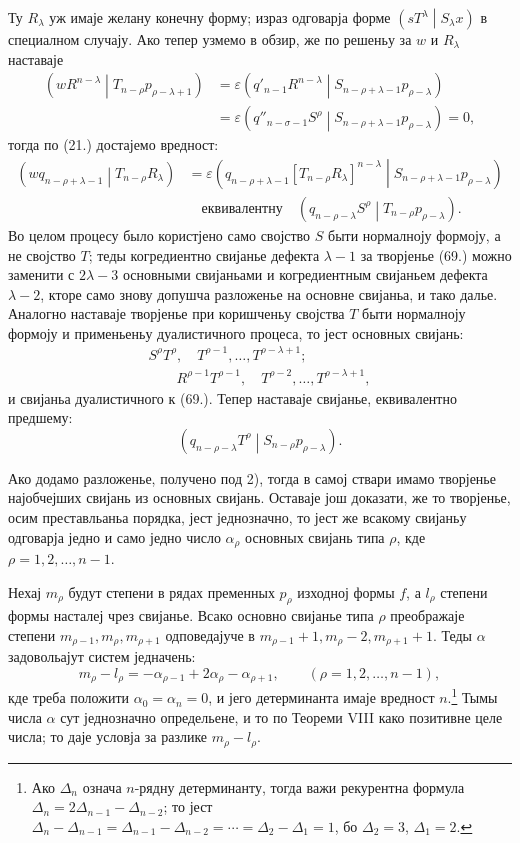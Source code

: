 ﻿\documentclass[11pt]{article}
\newcommand{\pair}[2]{\left(#1\middle|#2\right)}
\newcommand{\eps}{\varepsilon}
\begin{document}
Ту $R_\lambda$ уж имаје желану конечну форму; израз одговарја форме $\pair{sT^\lambda}{S_\lambda x}$ в специалном случају. Ако тепер узмемо в обзир, же по решеньу за $w$ и $R_\lambda$ наставаје
\[
\begin{aligned}
 \pair{wR^{n-\lambda}}{T_{n-\rho}p_{\rho-\lambda+1}}
 &=\eps\pair{q'_{n-1}R^{n-\lambda}}{S_{n-\rho+\lambda-1}p_{\rho-\lambda}}\\
 &=\eps\pair{q''_{n-\sigma-1}S^\rho}{S_{n-\rho+\lambda-1}p_{\rho-\lambda}}=0,
\end{aligned}
\]
тогда по (21.) достајемо вредност:
\[
\begin{aligned}
 \pair{wq_{n-\rho+\lambda-1}}{T_{n-\rho}R_\lambda}
 &=\eps\pair{q_{n-\rho+\lambda-1}[T_{n-\rho}R_\lambda]^{n-\lambda}}{S_{n-\rho+\lambda-1}p_{\rho-\lambda}}\\
 &\quad\text{еквивалентну}\quad
 \pair{q_{n-\rho-\lambda}S^\rho}{T_{n-\rho}p_{\rho-\lambda}}.
\end{aligned}
\]
Во целом процесу было користјено само својство $S$ быти нормалноју формоју, а не својство $T$; теды когредиентно свијанье дефекта $\lambda-1$ за творјенье (69.) можно заменити с $2\lambda-3$ основными свијаньами и когредиентным свијаньем дефекта $\lambda-2$, кторе само знову допушча разложенье на основне свијаньа, и тако далье. Аналогно наставаје творјенье при коришченьу својства $T$ быти нормалноју формоју и применьеньу дуалистичного процеса, то јест основных свијань:
\[
\begin{aligned}
 S^\rho T^\rho,\quad T^{\rho-1},\ldots,T^{\rho-\lambda+1};\\
 \qquad R^{\rho-1}T^{\rho-1},\quad T^{\rho-2},\ldots,T^{\rho-\lambda+1},
\end{aligned}
\]
и свијаньа дуалистичного к (69.). Тепер наставаје свијанье, еквивалентно предшему:
\[
 \pair{q_{n-\rho-\lambda}T^\rho}{S_{n-\rho}p_{\rho-\lambda}}.
\]

Ако додамо разложенье, получено под 2), тогда в самој ствари имамо творјенье најобчејших свијань из основных свијань. Оставаје још доказати, же то творјенье, осим преставльаньа порядка, јест једнозначно, то јест же всакому свијаньу одговарја једно и само једно число $\alpha_\rho$ основных свијань типа $\rho$, кде $\rho=1,2,\ldots,n-1$.

Нехај $m_\rho$ будут степени в рядах пременных $p_\rho$ изходној формы $f$, а $l_\rho$ степени формы насталеј чрез свијанье. Всако основно свијанье типа $\rho$ преображаје степени $m_{\rho-1},m_\rho,m_{\rho+1}$ одповедајуче в $m_{\rho-1}+1,m_\rho-2,m_{\rho+1}+1$. Теды $\alpha$ задовольајут систем једначень:
\begin{equation}
 m_\rho-l_\rho=-\alpha_{\rho-1}+2\alpha_\rho-\alpha_{\rho+1},
 \qquad (\rho=1,2,\ldots,n-1),
\tag{70}
\end{equation}
кде треба положити $\alpha_0=\alpha_n=0$, и јего детерминанта имаје вредност $n$.\footnote{Ако $\Delta_n$ означа $n$-рядну детерминанту, тогда важи рекурентна формула $\Delta_n=2\Delta_{n-1}-\Delta_{n-2}$; то јест $\Delta_n-\Delta_{n-1}=\Delta_{n-1}-\Delta_{n-2}=\cdots=\Delta_2-\Delta_1=1$, бо $\Delta_2=3$, $\Delta_1=2$.} Тымы числа $\alpha$ сут једнозначно определьене, и то по Теореми VIII како позитивне целе числа; то даје условја за разлике $m_\rho-l_\rho$.
\end{document}
